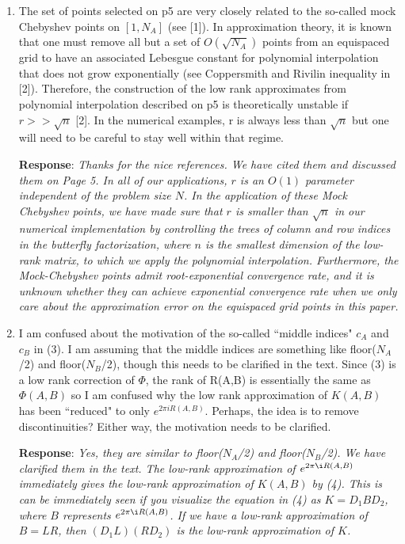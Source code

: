 \documentclass[11pt]{article}
\newcommand{\Response}{{\bf Response}}
\begin{document}
\begin{enumerate}

\item The set of points selected on p5 are very closely related to the so-called mock Chebyshev points on $[1,N_A]$ (see [1]). In approximation theory, it is known that one must remove all but a set of $O(\sqrt{N_A})$ points from an equispaced grid to have an associated Lebesgue constant for polynomial interpolation that does not grow exponentially (see Coppersmith and Rivilin inequality in [2]). Therefore, the construction of the low rank approximates from polynomial interpolation described on p5 is theoretically unstable if $r>>\sqrt{n}$ [2]. In the numerical examples, r is always less than $\sqrt{n}$ but one will need to be careful to stay well within that regime. 


\Response:  {\it Thanks for the nice references. We have cited them and discussed them on Page 5. In all of our applications, $r$ is an $O(1)$ parameter independent of the problem size $N$. In the application of these Mock Chebyshev points, we have made sure that $r$ is smaller than $\sqrt{n}$ in our numerical implementation by controlling the trees of column and row indices in the butterfly factorization, where $n$ is the smallest dimension of the low-rank matrix, to which we apply the polynomial interpolation. Furthermore, the Mock-Chebyshev points admit root-exponential convergence rate, and it is unknown whether they can achieve exponential convergence rate when we only care about the approximation error on the equispaced grid points in this paper.
}  


\item I am confused about the motivation of the so-called ``middle indices" $c_A$ and $c_B$ in (3). I am assuming that the middle indices are something like floor($N_A$/2) and floor($N_B$/2), though this needs to be clarified in the text. Since (3) is a low rank correction of $\Phi$, the rank of R(A,B) is essentially the same as $\Phi(A,B)$ so I am confused why the low rank approximation of $K(A,B)$ has been ``reduced" to only $e^{2\pi i R(A,B)}$. Perhaps, the idea is to remove discontinuities? Either way, the motivation needs to be clarified. 

\Response: {\it Yes, they are similar to floor($N_A$/2) and floor($N_B$/2). We have clarified them in the text. The low-rank approximation of $e^{2\pi\i R(A,B)}$ immediately gives the low-rank approximation of $K(A,B)$ by (4). This is can be immediately seen if you visualize the equation in (4) as $K=D_1 B D_2$, where $B$ represents $e^{2\pi\i R(A,B)}$. If we have a low-rank approximation of $B=LR$, then $(D_1L)(RD_2)$ is the low-rank approximation of $K$.}
 


\end{enumerate}
\end{document}

